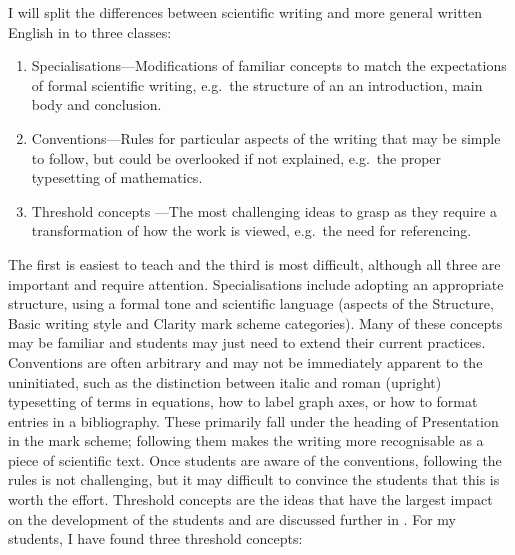 I will split the differences between scientific writing and more general written English in to three classes:
\begin{enumerate}
\item Specialisations---Modifications of familiar concepts to match the expectations of formal scientific writing, e.g.\ the structure of an an introduction, main body and conclusion.
\item Conventions---Rules for particular aspects of the writing that may be simple to follow, but could be overlooked if not explained, e.g.\ the proper typesetting of mathematics.
\item Threshold concepts \citep{Meyer2003}---The most challenging ideas to grasp as they require a transformation of how the work is viewed, e.g.\ the need for referencing.
\end{enumerate}
The first is easiest to teach and the third is most difficult, although all three are important and require attention. Specialisations include adopting an appropriate structure, using a formal tone and scientific language (aspects of the Structure, Basic writing style and Clarity mark scheme categories). Many of these concepts may be familiar and students may just need to extend their current practices. Conventions are often arbitrary and may not be immediately apparent to the uninitiated, such as the distinction between italic and roman (upright) typesetting of terms in equations, how to label graph axes, or how to format entries in a bibliography. These primarily fall under the heading of Presentation in the mark scheme; following them makes the writing more recognisable as a piece of scientific text. Once students are aware of the conventions, following the rules is not challenging, but it may difficult to convince the students that this is worth the effort. Threshold concepts are the ideas that have the largest impact on the development of the students and are discussed further in . For my students, I have found three threshold concepts:
